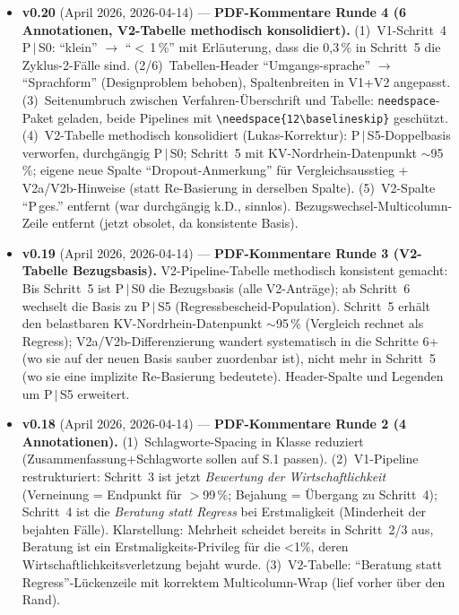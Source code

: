 \documentclass{umbruch-position}
\begin{document}
{\begin{itemize}[leftmargin=3em, itemsep=0.5em]
  \item \textbf{v0.20} (April 2026, 2026-04-14) --- \textbf{PDF-Kommentare Runde 4 (6 Annotationen, V2-Tabelle methodisch konsolidiert).} (1)~V1-Schritt~4 P\,$|$\,S0: ``klein'' $\to$ ``$<$\,1\,\%'' mit Erläuterung, dass die 0,3\,\% in Schritt~5 die Zyklus-2-Fälle sind. (2/6)~Tabellen-Header ``Umgangs-sprache'' $\to$ ``Sprachform'' (Designproblem behoben), Spaltenbreiten in V1+V2 angepasst. (3)~Seitenumbruch zwischen Verfahren-Überschrift und Tabelle: \texttt{needspace}-Paket geladen, beide Pipelines mit \texttt{\textbackslash needspace\{12\textbackslash baselineskip\}} geschützt. (4)~V2-Tabelle methodisch konsolidiert (Lukas-Korrektur): P\,$|$\,S5-Doppelbasis verworfen, durchgängig P\,$|$\,S0; Schritt~5 mit KV-Nordrhein-Datenpunkt $\sim$95\,\%; eigene neue Spalte ``Dropout-Anmerkung'' für Vergleichsausstieg + V2a/V2b-Hinweise (statt Re-Basierung in derselben Spalte). (5)~V2-Spalte ``P\,ges.'' entfernt (war durchgängig k.D., sinnlos). Bezugswechsel-Multicolumn-Zeile entfernt (jetzt obsolet, da konsistente Basis).

  \item \textbf{v0.19} (April 2026, 2026-04-14) --- \textbf{PDF-Kommentare Runde 3 (V2-Tabelle Bezugsbasis).} V2-Pipeline-Tabelle methodisch konsistent gemacht: Bis Schritt~5 ist P\,$|$\,S0 die Bezugsbasis (alle V2-Anträge); ab Schritt~6 wechselt die Basis zu P\,$|$\,S5 (Regressbescheid-Population). Schritt~5 erhält den belastbaren KV-Nordrhein-Datenpunkt $\sim$95\,\% (Vergleich rechnet als Regress); V2a/V2b-Differenzierung wandert systematisch in die Schritte 6+ (wo sie auf der neuen Basis sauber zuordenbar ist), nicht mehr in Schritt~5 (wo sie eine implizite Re-Basierung bedeutete). Header-Spalte und Legenden um P\,$|$\,S5 erweitert.

  \item \textbf{v0.18} (April 2026, 2026-04-14) --- \textbf{PDF-Kommentare Runde 2 (4 Annotationen).} (1)~Schlagworte-Spacing in Klasse reduziert (Zusammenfassung+Schlagworte sollen auf S.1 passen). (2)~V1-Pipeline restrukturiert: Schritt~3 ist jetzt \emph{Bewertung der Wirtschaftlichkeit} (Verneinung = Endpunkt für $>$99\,\%; Bejahung = Übergang zu Schritt~4); Schritt~4 ist die \emph{Beratung statt Regress} bei Erstmaligkeit (Minderheit der bejahten Fälle). Klarstellung: Mehrheit scheidet bereits in Schritt~2/3 aus, Beratung ist ein Erstmaligkeits-Privileg für die <1\%, deren Wirtschaftlichkeitsverletzung bejaht wurde. (3)~V2-Tabelle: ``Beratung statt Regress''-Lückenzeile mit korrektem Multicolumn-Wrap (lief vorher über den Rand).


\end{itemize}}
\end{document}
